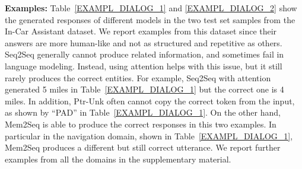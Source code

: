 \documentclass[11pt,a4paper]{article}
\begin{document}
\begin{table}[t]
\centering
{}
\setlength{\abovecaptionskip}{-3pt} 
\caption{Example of generated responses for the In-Car Assistant on the scheduling domain.}
\label{EXAMPL_DIALOG_2}
\end{table}

\noindent\textbf{Examples:} Table~\ref{EXAMPL_DIALOG_1} and \ref{EXAMPL_DIALOG_2} show the generated responses of different models in the two test set samples from the In-Car Assistant dataset. We report examples from this dataset since their answers are more human-like and not as structured and repetitive as others. 
Seq2Seq generally cannot produce related information, and sometimes fail in language modeling. Instead, using attention helps with this issue, but it still rarely produces the correct entities. For example, Seq2Seq with attention generated 5 miles in Table~\ref{EXAMPL_DIALOG_1} but the correct one is 4 miles. In addition, Ptr-Unk often cannot copy the correct token from the input, as shown by ``PAD'' in Table~\ref{EXAMPL_DIALOG_1}. On the other hand, Mem2Seq is able to produce the correct responses in this two examples. In particular in the navigation domain, shown in Table~\ref{EXAMPL_DIALOG_1}, Mem2Seq produces a different but still correct utterance. We report further examples from all the domains in the supplementary material. 
\end{document}
